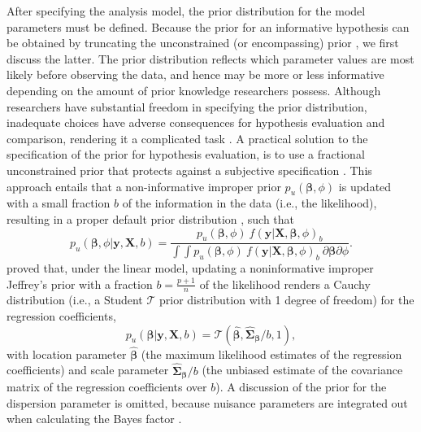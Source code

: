 \documentclass[
]{article}
\begin{document}
After specifying the analysis model, the prior distribution for the
model parameters must be defined. Because the prior for an informative
hypothesis can be obtained by truncating the unconstrained (or
encompassing) prior \citep[e.g.,][]{klugkist_inequality_2005}, we first
discuss the latter. The prior distribution reflects which parameter
values are most likely before observing the data, and hence may be more
or less informative depending on the amount of prior knowledge
researchers possess. Although researchers have substantial freedom in
specifying the prior distribution, inadequate choices have adverse
consequences for hypothesis evaluation and comparison, rendering it a
complicated task \citep{ohagan_fractional_1995}. A practical solution to
the specification of the prior for hypothesis evaluation, is to use a
fractional unconstrained prior \citep{ohagan_fractional_1995} that
protects against a subjective specification
\citep{gu_approximated_2018}. This approach entails that a
non-informative improper prior \(p_u(\boldsymbol{\beta}, \phi)\) is
updated with a small fraction \(b\) of the information in the data
(i.e., the likelihood), resulting in a proper default prior distribution
\citep[e.g.,][]{gu_approximated_2018, mulder_equality_2010}, such that
\[
p_u(\boldsymbol{\beta}, \phi|\boldsymbol{y}, \boldsymbol{X}, b) = 
\frac{
  p_u(\boldsymbol{\beta}, \phi) ~ f(\boldsymbol{y}|\boldsymbol{X}, \boldsymbol{\beta}, \phi)_b
}{
  \int \int p_u(\boldsymbol{\beta}, \phi) ~ 
  f(\boldsymbol{y}|\boldsymbol{X}, \boldsymbol{\beta}, \phi)_b ~ 
  \partial \boldsymbol{\beta} \partial \phi
}.
\] \citet{mulder_olssoncollentine_2019} proved that, under the linear
model, updating a noninformative improper Jeffrey's prior with a
fraction \(b = \frac{p+1}{n}\) of the likelihood renders a Cauchy
distribution (i.e., a Student \(\mathcal{T}\) prior distribution with 1
degree of freedom) for the regression coefficients, \[
p_u(\boldsymbol{\beta} | \boldsymbol{y}, \boldsymbol{X}, b) = 
\mathcal{T}(\boldsymbol{\hat{\beta}}, \boldsymbol{\hat{\Sigma}_\beta} / b, 1),
\] with location parameter \(\boldsymbol{\hat{\beta}}\) (the maximum
likelihood estimates of the regression coefficients) and scale parameter
\(\boldsymbol{\hat{\Sigma}_{\beta}} / b\) (the unbiased estimate of the
covariance matrix of the regression coefficients over \(b\)). A
discussion of the prior for the dispersion parameter is omitted, because
nuisance parameters are integrated out when calculating the Bayes factor
\citep{gu_approximated_2018}.
\end{document}
